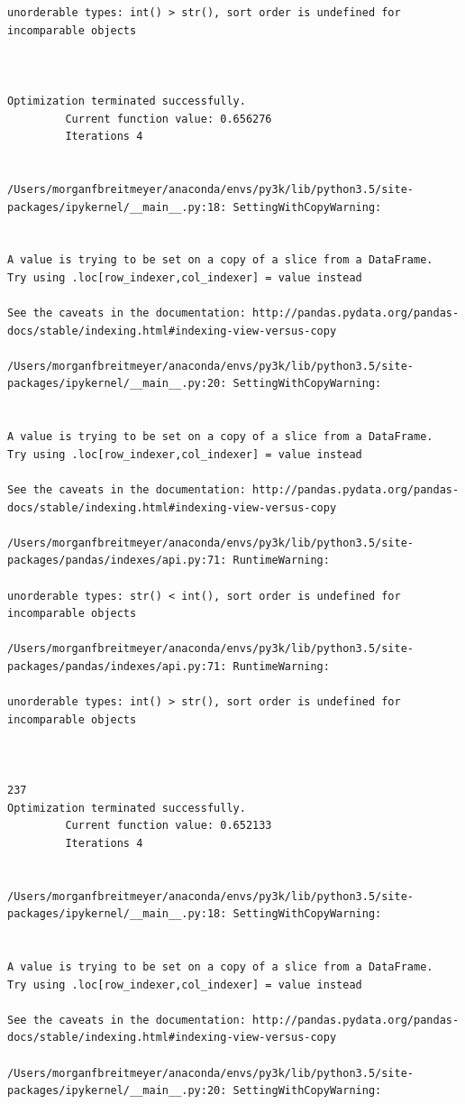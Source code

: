 \begin{lstlisting}
unorderable types: int() > str(), sort order is undefined for incomparable objects



Optimization terminated successfully.
         Current function value: 0.656276
         Iterations 4


/Users/morganfbreitmeyer/anaconda/envs/py3k/lib/python3.5/site-packages/ipykernel/__main__.py:18: SettingWithCopyWarning:


A value is trying to be set on a copy of a slice from a DataFrame.
Try using .loc[row_indexer,col_indexer] = value instead

See the caveats in the documentation: http://pandas.pydata.org/pandas-docs/stable/indexing.html#indexing-view-versus-copy

/Users/morganfbreitmeyer/anaconda/envs/py3k/lib/python3.5/site-packages/ipykernel/__main__.py:20: SettingWithCopyWarning:


A value is trying to be set on a copy of a slice from a DataFrame.
Try using .loc[row_indexer,col_indexer] = value instead

See the caveats in the documentation: http://pandas.pydata.org/pandas-docs/stable/indexing.html#indexing-view-versus-copy

/Users/morganfbreitmeyer/anaconda/envs/py3k/lib/python3.5/site-packages/pandas/indexes/api.py:71: RuntimeWarning:

unorderable types: str() < int(), sort order is undefined for incomparable objects

/Users/morganfbreitmeyer/anaconda/envs/py3k/lib/python3.5/site-packages/pandas/indexes/api.py:71: RuntimeWarning:

unorderable types: int() > str(), sort order is undefined for incomparable objects



237
Optimization terminated successfully.
         Current function value: 0.652133
         Iterations 4


/Users/morganfbreitmeyer/anaconda/envs/py3k/lib/python3.5/site-packages/ipykernel/__main__.py:18: SettingWithCopyWarning:


A value is trying to be set on a copy of a slice from a DataFrame.
Try using .loc[row_indexer,col_indexer] = value instead

See the caveats in the documentation: http://pandas.pydata.org/pandas-docs/stable/indexing.html#indexing-view-versus-copy

/Users/morganfbreitmeyer/anaconda/envs/py3k/lib/python3.5/site-packages/ipykernel/__main__.py:20: SettingWithCopyWarning:



\end{lstlisting}
